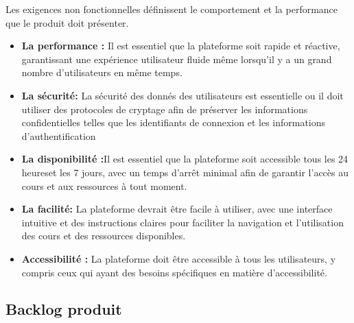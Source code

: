 Les exigences non fonctionnelles définissent le comportement et la performance que le produit doit présenter.
\begin{itemize}
\item \textbf{La performance :} Il est essentiel que la plateforme soit rapide et réactive, garantissant une expérience utilisateur fluide même lorsqu'il y a un grand nombre d'utilisateurs en même temps.

\item \textbf{La sécurité: }La sécurité des donnés des utilisateurs est essentielle ou il doit utiliser des protocoles de cryptage afin de préserver les informations confidentielles telles que les identifiants de connexion et les informations d’authentification

\item \textbf{La disponibilité :}Il est essentiel que la plateforme soit accessible tous les 24 heureset les 7 jours, avec un temps d'arrêt minimal afin de garantir l'accès au cours et aux ressources à tout moment.

\item \textbf{La facilité:} La plateforme devrait être facile à utiliser, avec une interface intuitive et des instructions claires pour faciliter la navigation et l'utilisation des cours et des ressources disponibles.

\item \textbf{Accessibilité :}  La plateforme doit être accessible à tous les utilisateurs, y compris ceux qui ayant des besoins spécifiques en matière d'accessibilité.
\end{itemize}

\newpage
\subsection{Backlog produit}


